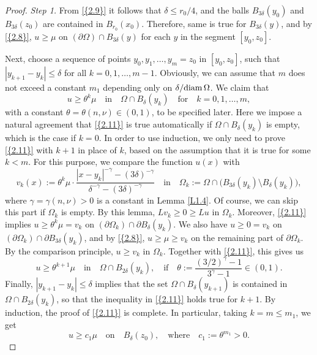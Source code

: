 \documentclass[regno,12pt]{amsart}
\theoremstyle{definition}
\theoremstyle{remark}
\begin{document}
\begin{proof} \emph{Step 1.} From {\eqref{{2.9}}} it follows that $\delta\le r_0/4$, and the balls $B_{3\delta}(y_0)$ and $B_{3\delta}(z_0)$ are contained in $B_{r_0}(x_0)$. Therefore, same is true for $B_{3\delta}(y)$, and by {\eqref{{2.8}}}, $u\ge\mu$ on $({\partial\Omega})\cap B_{3\delta}(y)$ for each $y$ in the segment $[y_0,z_0]$.

Next, choose a sequence of points $y_0,y_1,\ldots,y_m=z_0$ in $[y_0,z_0]$, such that $|y_{k+1}-y_k|\le \delta$ for all $k=0,1,\ldots,m-1$. Obviously, we can assume that $m$ does not exceed a constant $m_1$ depending only on $\delta/{{\rm diam}\,}\Omega$. We claim that
\begin{equation}\label{2.11}
    u\ge\theta^k\mu{\quad\text{{in}}\quad}\Omega\cap B_{\delta}(y_k)
    {\quad\text{{for}}\quad}k=0,1,\ldots,m,
\end{equation}
with a constant $\theta=\theta(n,\nu)\in (0,1)$, to be specified later. Here we impose a natural agreement that {\eqref{{2.11}}} is true automatically if $\Omega\cap B_{\delta}(y_k)$ is empty, which is the case if $k=0$. In order to use  induction, we only need to prove {\eqref{{2.11}}} with $k+1$ in place of $k$, based on the assumption that it is true for some $k<m$. For this purpose, we compare the function $u(x)$ with
    \[ v_k(x):=\theta^k\mu\cdot
    \frac{|x-y_k|^{-\gamma}-(3\delta)^{-\gamma}}
    {\delta^{-\gamma}-(3\delta)^{-\gamma}}
    {\quad\text{{in}}\quad}
    \Omega_k:=\Omega\cap
    \big(B_{3\delta}(y_k){\setminus} B_{\delta}(y_k)\big),\]
where $\gamma=\gamma(n,\nu)>0$ is a constant in Lemma \ref{L1.4}. Of course, we can skip this part if $\Omega_k$ is empty. By this lemma, $Lv_k\ge 0\ge Lu$ in $\Omega_k$. Moreover, {\eqref{{2.11}}} implies $u\ge\theta^k\mu=v_k$ on $({\partial\Omega}_k)\cap {\partial} B_{\delta}(y_k)$. We also have $u\ge 0=v_k$ on $({\partial\Omega}_k)\cap {\partial} B_{3\delta}(y_k)$, and by {\eqref{{2.8}}}, $u\ge\mu\ge v_k$ on the remaining part of ${\partial\Omega}_k$. By the comparison principle, $u\ge v_k$ in $\Omega_k$. Together with {\eqref{{2.11}}}, this gives us
    \[u\ge \theta^{k+1}\mu{\quad\text{{in}}\quad}
    \Omega\cap B_{2\delta}(y_k),{\quad\text{{if}}\quad}
    \theta:=\frac{(3/2)^{\gamma}-1}{3^{\gamma}-1}\in (0,1).\]
Finally, $|y_{k+1}-y_k|\le\delta$ implies that the set $\Omega\cap B_{\delta}(y_{k+1})$ is contained in $\Omega\cap B_{2\delta}(y_k)$, so that the inequality in {\eqref{{2.11}}} holds true for $k+1$. By induction, the proof of {\eqref{{2.11}}} is complete. In particular, taking $k=m\le m_1$, we get
    \begin{equation}\label{2.12}
    u\ge  c_1\mu{\quad\text{{on}}\quad} B_{\delta}(z_0),
    {\quad\text{{where}}\quad} c_1:=\theta^{m_1}>0.
    \end{equation}


\end{proof}
\end{document}
